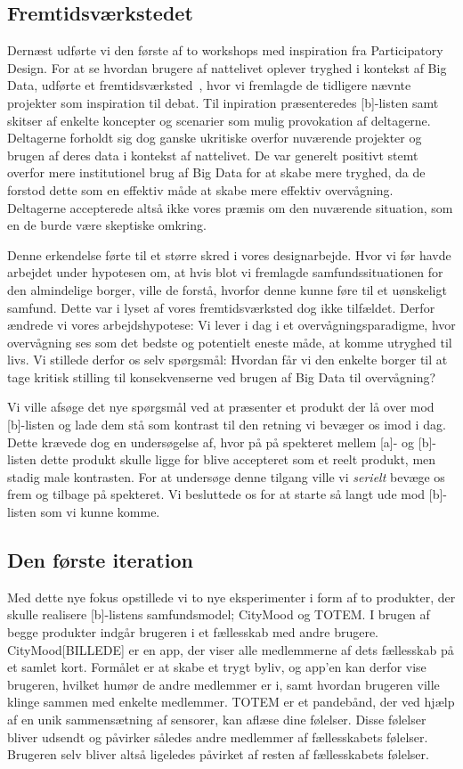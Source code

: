 \subsection*{Fremtidsværkstedet}
Dernæst udførte vi den første af to workshops med inspiration fra Participatory Design. For at se hvordan brugere af nattelivet oplever tryghed i kontekst af Big Data, udførte et fremtidsværksted~\cite[]{PD}, hvor vi fremlagde de tidligere nævnte projekter som inspiration til debat. Til inpiration præsenteredes [b]-listen samt skitser af enkelte koncepter og scenarier som mulig provokation af deltagerne. Deltagerne forholdt sig dog ganske ukritiske overfor nuværende projekter og brugen af deres data i kontekst af nattelivet. De var generelt positivt stemt overfor mere institutionel brug af Big Data for at skabe mere tryghed, da de forstod dette som en effektiv måde at skabe mere effektiv overvågning. Deltagerne accepterede altså ikke vores præmis om den nuværende situation, som en de burde være skeptiske omkring.

Denne erkendelse førte til et større skred i vores designarbejde. Hvor vi før havde arbejdet under hypotesen om, at hvis blot vi fremlagde samfundssituationen for den almindelige borger, ville de forstå, hvorfor denne kunne føre til et uønskeligt samfund. Dette var i lyset af vores fremtidsværksted dog ikke tilfældet. Derfor ændrede vi vores arbejdshypotese: Vi lever i dag i et overvågningsparadigme, hvor overvågning ses som det bedste og potentielt eneste måde, at komme utryghed til livs. Vi stillede derfor os selv spørgsmål: Hvordan får vi den enkelte borger til at tage kritisk stilling til konsekvenserne ved brugen af Big Data til overvågning?

Vi ville afsøge det nye spørgsmål ved at præsenter et produkt der lå over mod [b]-listen og lade dem stå som kontrast til den retning vi bevæger os imod i dag. Dette krævede dog en undersøgelse af, hvor på på spekteret mellem [a]- og [b]-listen dette produkt skulle ligge for blive accepteret som et reelt produkt, men stadig male kontrasten. For at undersøge denne tilgang ville vi \textit{serielt} bevæge os frem og tilbage på spekteret. Vi besluttede os for at starte så langt ude mod [b]-listen som vi kunne komme.

\subsection*{Den første iteration}
Med dette nye fokus opstillede vi to nye eksperimenter i form af to produkter, der skulle realisere [b]-listens samfundsmodel; CityMood og TOTEM. I brugen af begge produkter indgår brugeren i et fællesskab med andre brugere. CityMood[BILLEDE] er en app, der viser alle medlemmerne af dets fællesskab på et samlet kort. Formålet er at skabe et trygt byliv, og app'en kan derfor vise brugeren, hvilket humør de andre medlemmer er i, samt hvordan brugeren ville klinge sammen med enkelte medlemmer. TOTEM er et pandebånd, der ved hjælp af en unik sammensætning af sensorer, kan aflæse dine følelser. Disse følelser bliver udsendt og påvirker således andre medlemmer af fællesskabets følelser. Brugeren selv bliver altså ligeledes påvirket af resten af fællesskabets følelser.

